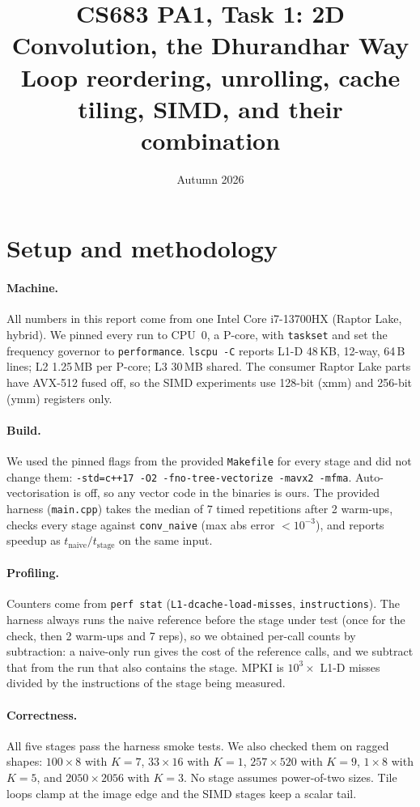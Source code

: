 \documentclass[11pt,a4paper]{article}
\title{\textbf{CS683 PA1, Task 1: 2D Convolution, the Dhurandhar Way}\\[4pt]
\large Loop reordering, unrolling, cache tiling, SIMD, and their combination}
\author{\teamtable}
\date{Autumn 2026}
\begin{document}
\maketitle

\section{Setup and methodology}

\paragraph{Machine.} All numbers in this report come from one Intel Core i7-13700HX (Raptor Lake, hybrid). We pinned every run to CPU~0, a P-core, with \texttt{taskset} and set the frequency governor to \texttt{performance}. \texttt{lscpu -C} reports L1-D 48\,KB, 12-way, 64\,B lines; L2 1.25\,MB per P-core; L3 30\,MB shared. The consumer Raptor Lake parts have AVX-512 fused off, so the SIMD experiments use 128-bit (xmm) and 256-bit (ymm) registers only.

\paragraph{Build.} We used the pinned flags from the provided \texttt{Makefile} for every stage and did not change them: \texttt{-std=c++17 -O2 -fno-tree-vectorize -mavx2 -mfma}. Auto-vectorisation is off, so any vector code in the binaries is ours. The provided harness (\texttt{main.cpp}) takes the median of 7 timed repetitions after 2 warm-ups, checks every stage against \texttt{conv\_naive} (max abs error $<10^{-3}$), and reports speedup as $t_{\text{naive}}/t_{\text{stage}}$ on the same input.

\paragraph{Profiling.} Counters come from \texttt{perf stat} (\texttt{L1-dcache-load-misses}, \texttt{instructions}). The harness always runs the naive reference before the stage under test (once for the check, then 2 warm-ups and 7 reps), so we obtained per-call counts by subtraction: a naive-only run gives the cost of the reference calls, and we subtract that from the run that also contains the stage. MPKI is $10^3 \times$ L1-D misses divided by the instructions of the stage being measured.

\paragraph{Correctness.} All five stages pass the harness smoke tests. We also checked them on ragged shapes: $100\times8$ with $K=7$, $33\times16$ with $K=1$, $257\times520$ with $K=9$, $1\times8$ with $K=5$, and $2050\times2056$ with $K=3$. No stage assumes power-of-two sizes. Tile loops clamp at the image edge and the SIMD stages keep a scalar tail.
\end{document}
